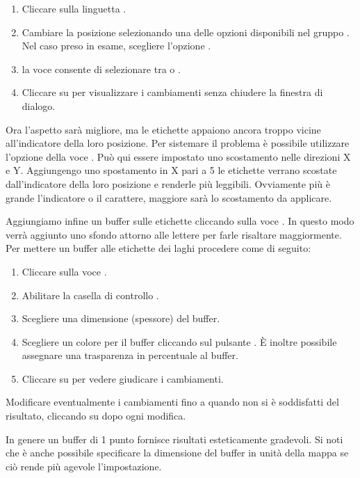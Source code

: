 \begin{enumerate} 
\item Cliccare sulla linguetta .
\item Cambiare la posizione selezionando una delle opzioni disponibili nel
gruppo . Nel caso preso in esame, scegliere l'opzione
.
\item la voce  consente di
selezionare tra  o .
\item Cliccare su  per visualizzare i cambiamenti senza chiudere
la finestra di dialogo.
\end{enumerate} 

Ora l'aspetto sarà migliore, ma le etichette appaiono ancora troppo vicine
all'indicatore della loro posizione. Per sistemare il problema è possibile
utilizzare l'opzione della voce . Può qui essere impostato uno
scostamento nelle direzioni X e Y. Aggiungengo uno spostamento in X pari a 5
le etichette verrano scostate dall'indicatore della loro posizione e renderle
più leggibili. Ovviamente più è grande l'indicatore o il carattere, maggiore
sarà lo scostamento da applicare.

Aggiungiamo infine un buffer sulle etichette cliccando sulla voce
. In questo modo verrà aggiunto uno sfondo attorno alle lettere
per farle risaltare maggiormente. Per mettere un buffer alle etichette dei
laghi procedere come di seguito:

\begin{enumerate}
\item Cliccare sulla voce .
\item Abilitare la casella di controllo .
\item Scegliere una dimensione (spessore) del buffer.
\item Scegliere un colore per il buffer cliccando sul pulsante
. È inoltre possibile assegnare una trasparenza in percentuale
al buffer.
\item Cliccare su  per vedere giudicare i cambiamenti.
\end{enumerate} 

Modificare eventualmente i cambiamenti fino a quando non si è soddisfatti del
risultato, cliccando su  dopo ogni modifica.

In genere un buffer di 1 punto fornisce risultati esteticamente gradevoli.
Si noti che è anche possibile specificare la dimensione del buffer in unità
della mappa se ciò rende più agevole l'impostazione.

